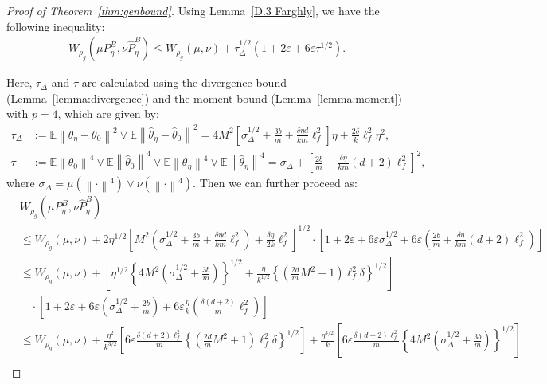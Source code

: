 \documentclass{article}
\newcommand{\norm}[1]{\left\lVert#1\right\rVert} %
\begin{document}
\begin{proof}[Proof of Theorem~\ref{thm:genbound}]
	Using Lemma~\ref{D.3 Farghly}, we have the following inequality:
	\begin{align*}
		W_{\rho_g} (\mu P_\eta^B, \nu \widehat{P}_\eta^B) \leq W_{\rho_g}(\mu, \nu) + \tau_\Delta ^{1/2} (1+2\varepsilon+6\varepsilon\tau^{1/2}).
	\end{align*}
	
	Here, $\tau_\Delta$ and $\tau$ are calculated using the divergence bound (Lemma~\ref{lemma:divergence}) and the moment bound (Lemma~\ref{lemma:moment}) with $p=4$, which are given by:
	\begin{align*}
		\tau_\Delta &:= \mathbb{E} \norm{\theta_\eta - \theta_0}^2 \vee \mathbb{E}\norm{\widehat{\theta}_\eta - \widehat{\theta}_0}^2 = 4M^2 \left[\sigma_\Delta^{1/2} +   \frac{3b}{m} +\frac{\delta \eta d}{k m}  \ell_f^2 \right] \eta+\frac{2\delta }{k} \ell_f^2 \eta^2,\\
		\tau &:= \mathbb{E} \norm{\theta_0}^4 \vee \mathbb{E} \norm{\widehat{\theta}_0}^4 \vee \mathbb{E} \norm{\theta_\eta}^4 \vee \mathbb{E} \norm{\widehat{\theta}_\eta}^4 = \sigma_\Delta + \left[\frac{2b}{m} +\frac{\delta \eta}{km} (d+2)   \ell_f^2\right]^{2},
	\end{align*}
	where $\sigma_\Delta = \mu(\norm{\cdot}^4) \vee  \nu(\norm{\cdot}^4)$. Then we can further proceed as:
	\begin{align*}
		&W_{\rho_g} (\mu P_\eta^B, \nu \widehat{P}_\eta^B) \\
        &\leq W_{\rho_g}(\mu, \nu) + 2\eta^{1/2} \left[M^2 \left(\sigma_\Delta^{1/2} +   \frac{3b}{m} +\frac{\delta \eta d}{k m}  \ell_f^2 \right) +\frac{\delta \eta}{2k} \ell_f^2  \right]^{1/2} \cdot \left[1 +2\varepsilon + 6\varepsilon \sigma_\Delta^{1/2} + 6\varepsilon  \left(\frac{2b}{m} +\frac{\delta \eta}{km} (d+2)  \ell_f^2 \right) \right]\\
		&\leq W_{\rho_g}(\mu, \nu) + \left[\eta^{1/2} \left\{4M^2 \left(\sigma_\Delta^{1/2} +   \frac{3b}{m}\right)\right\}^{1/2} + \frac{\eta }{k^{1/2}} \left\{ \left(\frac{2d}{m} M^2 + 1 \right) \ell_f^2 \delta  \right\}^{1/2} \right]\\
		&\quad\cdot \left[1 +2\varepsilon + 6\varepsilon  \left(\sigma_\Delta^{1/2} + \frac{2b}{m} \right)+ 6\varepsilon \frac{\eta}{k} \left(\frac{\delta (d+2) }{m} \ell_f^2 \right) \right]\\
		&\leq W_{\rho_g}(\mu, \nu) + \frac{\eta^2}{k^{3/2}} \left[6\varepsilon\frac{\delta (d+2) \ell_f^2}{m}  \left\{ \left(\frac{2d}{m} M^2 + 1 \right) \ell_f^2 \delta  \right\}^{1/2}  \right]+\frac{\eta^{3/2}}{k}\left[6\varepsilon\frac{\delta (d+2) \ell_f^2}{m}  \left\{4M^2 \left(\sigma_\Delta^{1/2}+   \frac{3b}{m}\right)\right\}^{1/2} \right]\\

\end{align*}
\end{proof}
\end{document}
